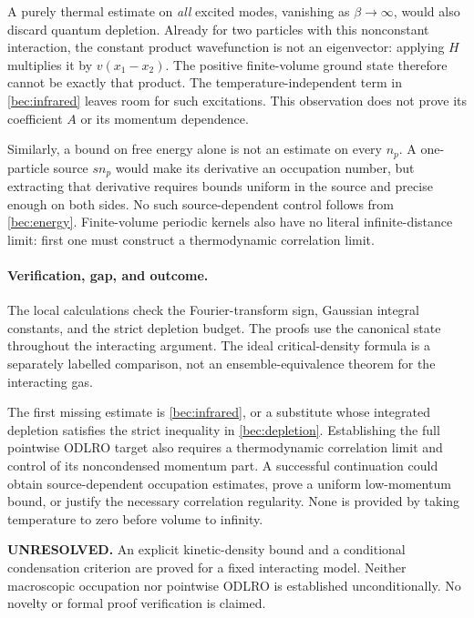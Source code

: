 \documentclass[11pt]{article}
\begin{document}
A purely thermal estimate on \emph{all} excited modes, vanishing as
$\beta\to\infty$, would also discard quantum depletion. Already for
two particles with this nonconstant interaction, the constant product
wavefunction is not an eigenvector: applying $H$ multiplies it by
$v(x_1-x_2)$. The positive finite-volume ground state therefore cannot
be exactly that product. The temperature-independent term in
\eqref{bec:infrared} leaves room for such excitations. This observation
does not prove its coefficient $A$ or its momentum dependence.

Similarly, a bound on free energy alone is not an estimate on every
$n_p$. A one-particle source $s n_p$ would make its derivative an
occupation number, but extracting that derivative requires bounds
uniform in the source and precise enough on both sides. No such
source-dependent control follows from \eqref{bec:energy}.
Finite-volume periodic kernels also have no literal infinite-distance
limit: first one must construct a thermodynamic correlation limit.

\paragraph{Verification, gap, and outcome.}
The local calculations check the Fourier-transform sign, Gaussian
integral constants, and the strict depletion budget. The proofs use
the canonical state throughout the interacting argument. The ideal
critical-density formula is a separately labelled comparison, not an
ensemble-equivalence theorem for the interacting gas.

The first missing estimate is \eqref{bec:infrared}, or a substitute
whose integrated depletion satisfies the strict inequality in
\eqref{bec:depletion}. Establishing the full pointwise ODLRO target
also requires a thermodynamic correlation limit and control of its
noncondensed momentum part. A successful continuation could obtain
source-dependent occupation estimates, prove a uniform low-momentum
bound, or justify the necessary correlation regularity. None is
provided by taking temperature to zero before volume to infinity.

\textbf{UNRESOLVED.} An explicit kinetic-density bound and a conditional
condensation criterion are proved for a fixed interacting model.
Neither macroscopic occupation nor pointwise ODLRO is established
unconditionally. No novelty or formal proof verification is claimed.
\end{document}

